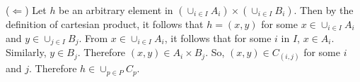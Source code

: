 \documentclass{article}
\begin{document}
($\Leftarrow$) Let $h$ be an arbitrary element in $(\cup_{i \in I}A_i)
\times (\cup_{i \in I}B_i)$. Then by the definition of cartesian
product, it follows that $h = (x,y)$ for some $x \in \cup_{i \in
  I}A_i$ and $y \in \cup_{j \in I}B_j$. From $x \in \cup_{i \in
  I}A_i$, it follows that for some $i$ in $I$, $x \in A_i$. Similarly,
$y \in B_j$. Therefore $(x,y) \in A_i \times B_j$. So, $(x,y) \in
C_{(i,j)}$ for some $i$ and $j$. Therefore $h \in \cup_{p \in P}C_p$.
\end{document}
